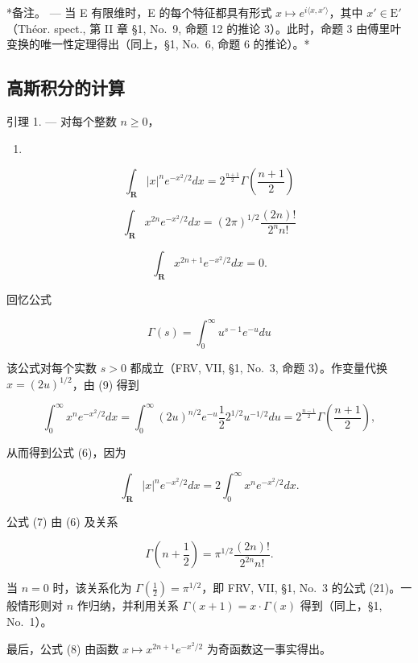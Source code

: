 *备注。 --- 当 E 有限维时，E 的每个特征都具有形式 \(x \mapsto e^{i\langle x,x' \rangle}\)，其中 \(x' \in \mathrm{E}'\)（Théor. spect., 第 II 章 §1, No.~9, 命题 12 的推论 3）。此时，命题 3 由傅里叶变换的唯一性定理得出（同上，§1, No.~6, 命题 6 的推论）。*

\subsection{高斯积分的计算}

引理 1. --- 对每个整数 \(n \geqslant 0\)，

\begin{enumerate}
\def\labelenumi{(\arabic{enumi})}
\setcounter{enumi}{5}
\tightlist
\item
\end{enumerate}

\[
\int_ {\mathbf {R}} | x | ^ {n} e ^ {- x ^ {2} / 2} d x = 2 ^ {\frac {n + 1}{2}} \Gamma \left(\frac {n + 1}{2}\right)\tag{7}
\]

\[
\int_ {\mathbf {R}} x ^ {2 n} e ^ {- x ^ {2} / 2} d x = (2 \pi) ^ {1 / 2} \frac {(2 n) !}{2 ^ {n} n !}\tag{8}
\]

\[
\int_ {\mathbf {R}} x ^ {2 n + 1} e ^ {- x ^ {2} / 2} d x = 0.
\]

回忆公式

\[
\Gamma (s) = \int_ {0} ^ {\infty} u ^ {s - 1} e ^ {- u} d u\tag{9}
\]

该公式对每个实数 \(s > 0\) 都成立（FRV, VII, §1, No.~3, 命题 3）。作变量代换 \(x = (2u)^{1/2}\)，由 (9) 得到

\[
\int_ {0} ^ {\infty} x ^ {n} e ^ {- x ^ {2} / 2} d x = \int_ {0} ^ {\infty} (2 u) ^ {n / 2} e ^ {- u} \frac {1}{2} 2 ^ {1 / 2} u ^ {- 1 / 2} d u = 2 ^ {\frac {n - 1}{2}} \Gamma \left(\frac {n + 1}{2}\right),
\]

从而得到公式 (6)，因为

\[
\int_ {\mathbf {R}} | x | ^ {n} e ^ {- x ^ {2} / 2} d x = 2 \int_ {0} ^ {\infty} x ^ {n} e ^ {- x ^ {2} / 2} d x.
\]

公式 (7) 由 (6) 及关系

\[
\Gamma \left(n + \frac {1}{2}\right) = \pi^ {1 / 2} \frac {(2 n) !}{2 ^ {2 n} n !}.\tag{10}
\]

当 \(n = 0\) 时，该关系化为 \(\Gamma(\frac{1}{2}) = \pi^{1/2}\)，即 FRV, VII, §1, No.~3 的公式 (21)。一般情形则对 \(n\) 作归纳，并利用关系 \(\Gamma(x + 1) = x \cdot \Gamma(x)\) 得到（同上，§1, No.~1）。

最后，公式 (8) 由函数 \(x \mapsto x^{2n+1}e^{-x^2/2}\) 为奇函数这一事实得出。

